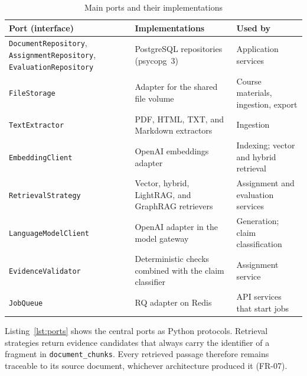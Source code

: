 \documentclass[12pt,a4paper]{article}
\begin{document}
\begin{table}[htbp]
\centering
\small
\renewcommand{\arraystretch}{1.3}
\begin{tabularx}{\textwidth}{|p{50mm}|X|p{45mm}|}
\hline
\textbf{Port (interface)} &
\textbf{Implementations} &
\textbf{Used by} \\
\hline
\texttt{DocumentRepository}, \texttt{AssignmentRepository},
\texttt{EvaluationRepository} &
PostgreSQL repositories (psycopg~3) &
Application services \\
\hline
\texttt{FileStorage} &
Adapter for the shared file volume &
Course materials, ingestion, export \\
\hline
\texttt{TextExtractor} &
PDF, HTML, TXT, and Markdown extractors &
Ingestion \\
\hline
\texttt{EmbeddingClient} &
OpenAI embeddings adapter &
Indexing; vector and hybrid retrieval \\
\hline
\texttt{RetrievalStrategy} &
Vector, hybrid, LightRAG, and GraphRAG retrievers &
Assignment and evaluation services \\
\hline
\texttt{LanguageModelClient} &
OpenAI adapter in the model gateway &
Generation; claim classification \\
\hline
\texttt{EvidenceValidator} &
Deterministic checks combined with the claim classifier &
Assignment service \\
\hline
\texttt{JobQueue} &
RQ adapter on Redis &
API services that start jobs \\
\hline
\end{tabularx}
\caption{Main ports and their implementations}
\label{tab:architecture-ports}
\end{table}

Listing~\ref{lst:ports} shows the central ports as Python protocols.
Retrieval strategies return evidence candidates that always carry
the identifier of a fragment in \texttt{document\_chunks}. Every
retrieved passage therefore remains traceable to its source document,
whichever architecture produced it (FR-07).
\end{document}
